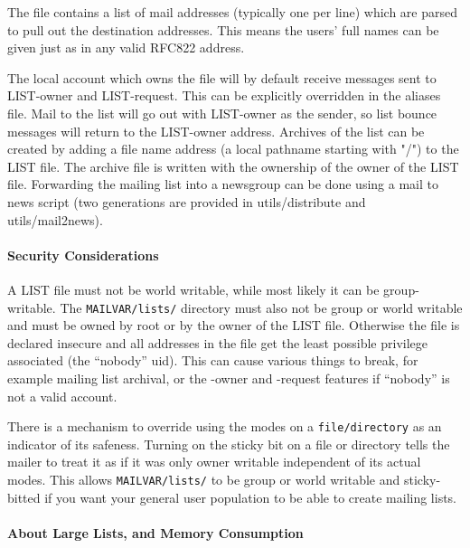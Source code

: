 The file contains a list of mail addresses (typically one per line)
which are parsed to pull out the destination addresses.  This means
the users' full names can be given just as in any valid RFC822 address.

The local account which owns the file will by default receive messages
sent to LIST-owner and LIST-request.  This can be explicitly overridden
in the aliases file.  Mail to the list will go out with LIST-owner as
the sender, so list bounce messages will return to the LIST-owner
address.  Archives of the list can be created by adding a file name
address (a local pathname starting with "/") to the LIST file.  The
archive file is written with the ownership of the owner of the LIST
file.  Forwarding the mailing list into a newsgroup
can be done using a mail to news script (two generations are provided
in utils/distribute and utils/mail2news).




\paragraph{Security Considerations}



A LIST file must not be world writable, while most likely it can be
group-writable.  The {\tt MAILVAR/lists/} directory must also not be group
or world writable and must be owned by root or by the owner of the
LIST file.  Otherwise the file is declared insecure and all addresses
in the file get the least possible privilege associated (the ``nobody''
uid).  This can cause various things to break, for example mailing
list archival, or the -owner and -request features if ``nobody'' is
not a valid account.

There is a mechanism to override using the modes on a {\tt file/directory}
as an indicator of its safeness.  Turning on the sticky bit on a file
or directory tells the mailer to treat it as if it was only owner
writable independent of its actual modes.  This allows {\tt MAILVAR/lists/}
to be group or world writable and sticky-bitted if you want your general
user population to be able to create mailing lists.




\paragraph{About Large Lists, and Memory Consumption}



